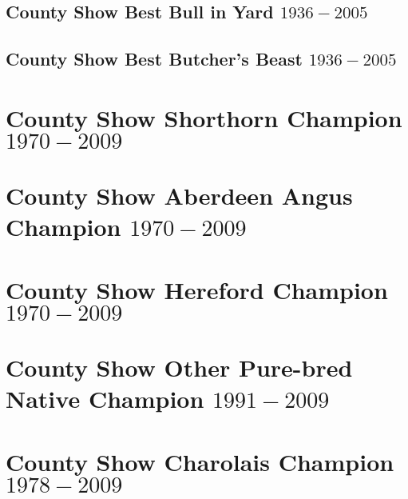 \subsection[Best Bull in Yard $1936 - 2005$]{County Show Best Bull in Yard $1936 - 2005$}
\small

\normalsize
\newpage
\subsection[Best Butcher's Beast $1936 - 2005$]{County Show Best Butcher's Beast $1936 - 2005$}
\small

\normalsize
\pagebreak


\section[Shorthorn Champion]{County Show Shorthorn Champion $1970 - 2009$}
\small

\normalsize
\newpage
\section[Aberdeen Angus Champion]{County Show Aberdeen Angus Champion $1970 - 2009$}
\small

\normalsize
\newpage
\section[Hereford Champion]{County Show Hereford Champion $1970 - 2009$}
\small

\normalsize
\newpage
\section[Other Pure-bred Native Champion]{County Show Other Pure-bred Native Champion $1991 - 2009$}
\small

\normalsize
\newpage
\section[Charolais Champion]{County Show Charolais Champion $1978-2009$}
\small

\normalsize
\newpage
